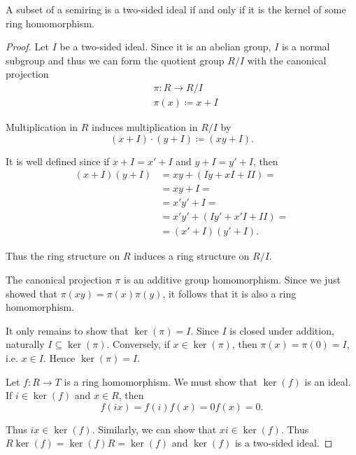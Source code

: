 \begin{definition}\label{thm:semiring_ideal_iff_kernel}
  A subset of a semiring is a two-sided ideal if and only if it is the kernel of some ring homomorphism.
\end{definition}
\begin{proof}
  \Implies Let \( I \) be a two-sided ideal. Since it is an abelian group, \( I \) is a normal subgroup and thus we can form the quotient group \( R / I \) with the canonical projection
  \begin{align*}
    &\pi: R \to R / I \\
    &\pi(x) \coloneqq x + I
  \end{align*}

  Multiplication in \( R \) induces multiplication in \( R / I \) by
  \begin{equation*}
    (x + I) \cdot (y + I) \coloneqq (xy + I).
  \end{equation*}

  It is well defined since if \( x + I = x' + I \) and \( y + I = y' + I \), then
  \begin{align*}
    (x + I) (y + I)
    &=
    xy + (Iy + xI + II)
    = \\ &=
    xy + I
    = \\ &=
    x'y' + I
    = \\ &=
    x'y' + (Iy' + x'I + II)
    = \\ &=
    (x' + I) (y' + I).
  \end{align*}

  Thus the ring structure on \( R \) induces a ring structure on \( R / I \).

  The canonical projection \( \pi \) is an additive group homomorphism. Since we just showed that \( \pi(xy) = \pi(x) \pi(y) \), it follows that it is also a ring homomorphism.

  It only remains to show that \( \ker(\pi) = I \). Since \( I \) is closed under addition, naturally \( I \subseteq \ker(\pi) \). Conversely, if \( x \in \ker(\pi) \), then \( \pi(x) = \pi(0) = I \), i.e. \( x \in I \). Hence \( \ker(\pi) = I \).

  \ImpliedBy Let \( f: R \to T \) is a ring homomorphism. We must show that \( \ker(f) \) is an ideal. If \( i \in \ker(f) \) and \( x \in R \), then
  \begin{equation*}
    f(ix) = f(i) f(x) = 0 f(x) = 0.
  \end{equation*}

  Thus \( ix \in \ker(f) \). Similarly, we can show that \( xi \in \ker(f) \). Thus \( R \ker(f) = \ker(f) R = \ker(f) \) and \( \ker(f) \) is a two-sided ideal.
\end{proof}

